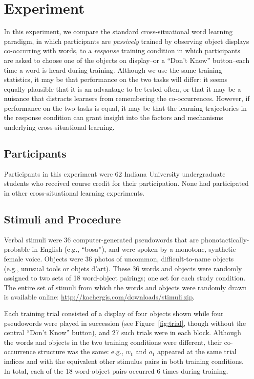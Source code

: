 \documentclass[man,floatsintext]{apa6}
\begin{document}
\section{Experiment}

In this experiment, we compare the standard cross-situational word learning paradigm, in which participants are {\em passively} trained by observing object displays co-occurring with words, to a {\em response} training condition in which participants are asked to choose one of the objects on display--or a ``Don't Know'' button--each time a word is heard during training. Although we use the same training statistics, it may be that performance on the two tasks will differ: it seems equally plausible that it is an advantage to be tested often, or that it may be a nuisance that distracts learners from remembering the co-occurrences. However, if performance on the two tasks is equal, it may be that the learning trajectories in the response condition can grant insight into the factors and mechanisms underlying cross-situational learning.

\subsection{Participants}

Participants in this experiment were 62 Indiana University undergraduate students who received course credit for their participation. None had participated in other cross-situational learning experiments.

\subsection{Stimuli and Procedure}

Verbal stimuli were 36 computer-generated pseudowords that are phonotactically-probable in English (e.g., ``bosa''), and were spoken by a monotone, synthetic female voice. Objects were 36 photos of uncommon, difficult-to-name objects (e.g., unusual tools or objets d'art). These 36 words and objects were randomly assigned to two sets of 18 word-object pairings; one set for each study condition. The entire set of stimuli from which the words and objects were randomly drawn is available online: \url{http://kachergis.com/downloads/stimuli.zip}.

Each training trial consisted of a display of four objects shown while four pseudowords were played in succession (see Figure~\ref{fig:trial}, though without the central ``Don't Know'' button), and 27 such trials were in each block. Although the words and objects in the two training conditions were different, their co-occurrence structure was the same: e.g., $w_1$ and $o_1$ appeared at the same trial indices and with the equivalent other stimulus pairs in both training conditions. In total, each of the 18 word-object pairs occurred 6 times during training. 
\end{document}
